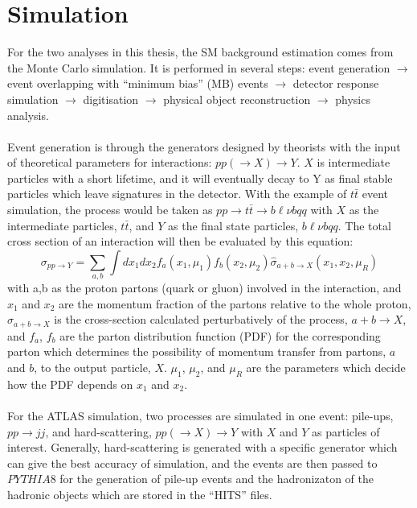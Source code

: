 \section{Simulation}
\label{sec:simulation}
For the two analyses in this thesis, the SM background estimation comes from the Monte Carlo simulation. It is performed in several steps: event generation $\rightarrow$ event overlapping with ``minimum bias'' (MB) events $\rightarrow$  detector response simulation $\rightarrow$ digitisation $\rightarrow$ physical object reconstruction $\rightarrow$ physics analysis.
\\
\\Event generation is through the generators designed by theorists with the input of theoretical parameters for interactions: $pp(\rightarrow X)\rightarrow Y$. $X$ is intermediate particles with a short lifetime, and it will eventually decay to Y as final stable particles which leave signatures in the detector. With the example of $t\bar{t}$ event simulation, the process would be taken as $pp\rightarrow t\bar{t}\rightarrow b\ell\nu bqq$ with $X$ as the intermediate particles, $t\bar{t}$, and $Y$ as the final state particles, $b\ell\nu bqq$. The total cross section of an interaction will then be evaluated by this equation\cite{Plehn:2008zs}: 
\begin{equation}
\sigma_{pp\rightarrow Y} = \sum_{a,b} \int dx_{1}dx_{2}f_{a}(x_{1},\mu_{1})f_{b}(x_{2},\mu_{2})\hat{\sigma}_{a+b\rightarrow X}(x_{1},x_{2},\mu_{R})
\end{equation}
with a,b as the proton partons (quark or gluon) involved in the interaction, and $x_{1}$ and $x_{2}$ are the momentum fraction of the partons relative to the whole proton, $\hat{\sigma}_{a+b\rightarrow X}$ is the cross-section calculated perturbatively of the process, $a+b\rightarrow X$, and $f_{a}$, $f_{b}$ are the parton distribution function (PDF) for the corresponding parton which determines the possibility of momentum transfer from partons, $a$ and $b$, to the output particle, $X$. $\mu_{1}$, $\mu_{2}$, and $\mu_{R}$ are the parameters which decide how the PDF depends on $x_1$ and $x_2$.
\\
\\For the ATLAS simulation, two processes are simulated in one event: pile-ups, $pp\rightarrow jj$, and hard-scattering, $pp(\rightarrow X)\rightarrow Y$ with $X$ and $Y$ as particles of interest. Generally, hard-scattering is generated with a specific generator which can give the best accuracy of simulation, and the events are then passed to $PYTHIA8$\cite{Sjostrand:2008vc,Sjostrand:2007gs} for the generation of pile-up events and the hadronizaton of the hadronic objects which are stored in the ``HITS'' files.
